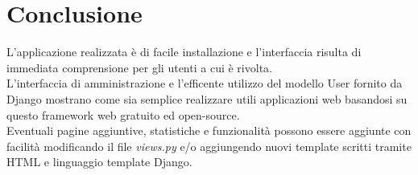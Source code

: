 \documentclass{scrreprt}
\begin{document}

\chapter{Conclusione}

L'applicazione realizzata è di facile installazione e l'interfaccia risulta di immediata comprensione per gli utenti a cui è rivolta.\\
L'interfaccia di amministrazione e l'efficente utilizzo del modello User fornito da Django mostrano come sia semplice realizzare utili applicazioni web basandosi su questo framework web gratuito ed open-source. \\
Eventuali pagine aggiuntive, statistiche e funzionalità possono essere aggiunte con facilità modificando il file \textit{views.py} e/o aggiungendo nuovi template scritti tramite HTML e linguaggio template Django.


\pagebreak
\blankpage{}
\end{document}
